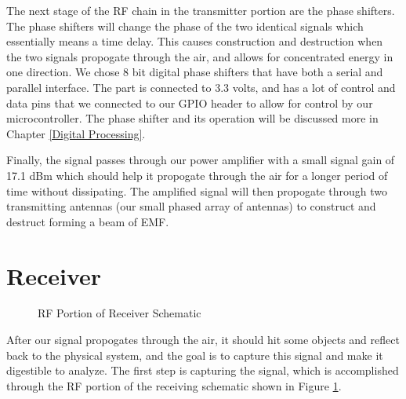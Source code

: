 The next stage of the RF chain in the transmitter portion are the phase shifters. The phase shifters will change the phase
of the two identical signals which essentially means a time delay. This causes construction and destruction when the
two signals propogate through the air, and allows for concentrated energy in one direction. We chose 8 bit digital 
phase shifters that have both a serial and parallel interface. The part is connected to 3.3 volts, and has a lot of control and
data pins that we connected to our GPIO header to allow for control by our microcontroller. The phase shifter and its
operation will be discussed more in Chapter \ref{Digital Processing}. 

Finally, the signal passes through our power amplifier with a small signal gain of 17.1 dBm which should help it propogate
through the air for a longer period of time without dissipating. The amplified signal will then propogate through two transmitting
antennas (our small phased array of antennas) to construct and destruct forming a beam of EMF.

\section{Receiver}
\begin{figure}[H]
  \centering
\caption{RF Portion of Receiver Schematic}
\label{img:receiverschem}
\end{figure}
After our signal propogates through the air, it should hit some objects and reflect back to the physical system, and the
goal is to capture this signal and make it digestible to analyze. The first step is capturing the signal, which is accomplished
through the RF portion of the receiving schematic shown in Figure \ref{img:receiverschem}.

